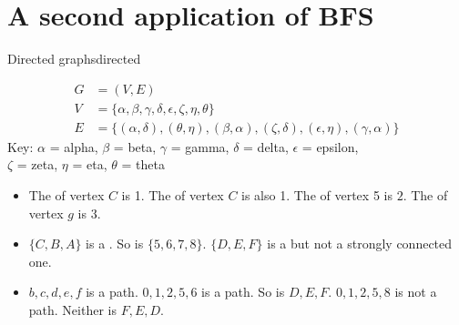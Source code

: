 \documentclass{tufte-handout}
\begin{document}
\pause

\section{A second application of BFS}

\begin{model}{Directed graphs}{directed}
  \begin{center}
    \begin{minipage}{0.45\textwidth}
      
    \end{minipage}
    \begin{minipage}{0.45\textwidth}
      
    \end{minipage}

    \vspace{1em}
    \begin{minipage}{0.45\textwidth}
      
    \end{minipage}
  \begin{minipage}{0.45\textwidth}
    \begin{align*}
      G &= (V,E) \\
      V &= \{\alpha, \beta, \gamma, \delta, \epsilon, \zeta, \eta,
          \theta\} \\
      E &= \{(\alpha, \delta), (\theta, \eta), (\beta, \alpha),
          (\zeta, \delta), (\epsilon, \eta), (\gamma, \alpha)\}
    \end{align*}
    {\scriptsize
      Key: $\alpha$ = alpha, $\beta$ = beta, $\gamma$ = gamma, $\delta$ =
      delta, $\epsilon$ = epsilon, \\ $\zeta$ = zeta, $\eta$ = eta,
      $\theta$ = theta
    }
  \end{minipage}
  \end{center}

  \begin{itemize}
  \item The  of vertex $C$ is 1.  The 
    of vertex $C$ is also 1.  The  of vertex 5 is $2$.
    The  of vertex $g$ is $3$.
  \item $\{C,B,A\}$ is a .  So is
    $\{5,6,7,8\}$.  $\{D,E,F\}$ is a 
    but not a strongly connected one.
  \item $b,c,d,e,f$ is a path.  $0,1,2,5,6$ is a path.  So is $D,E,F$.
    $0,1,2,5,8$ is not a path.  Neither is $F,E,D$.
  \end{itemize}
\end{model}
\end{document}
